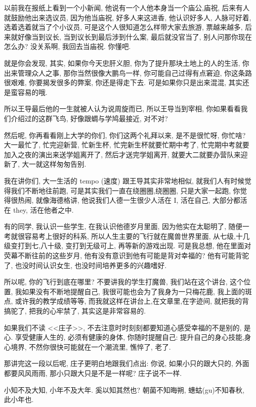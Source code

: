 \documentclass[11pt]{article}
\begin{document}
以前我在报纸上看到一个小新闻, 他说有一个人他本身当一个庙公,庙祝, 后来有人就鼓励他出来选议员, 因为他当庙祝, 好多人来这进香, 他认识好多人, 人脉可好着, 选着选着就当了个小议员, 可是这个人很知道怎么样带大家去旅游, 票越来越多, 后来就好像当到议长, 当到议长到最后涉到什么案, 最后就没官当了, 别人问那你现在怎么办? 没关系啊, 我回去当庙祝. 你懂吧. 

就是你会发现, 其实, 如果你今天忠肝义胆, 你为了提升那块土地上的人的生活, 你出来管理众人之事, 那你当然很像大鹏鸟一样, 你可能自己过得有点窘迫, 你这条路很艰难, 你要揭发很多的弊案, 你还是得走下去. 可是如果你只是出来混混, 其实还是蛮容易的哦.

所以王导最后他的一生就被人认为说周旋而已, 所以王导当到宰相, 你如果看看我们介绍过的这群飞鸟, 好像跟蜩与学鸠最接近, 对不对? 
 
然后呢, 你再看看刚上大学的你们, 你们这两个礼拜以来, 是不是很忙呀, 你忙啥? 大一最忙了, 忙完迎新营, 忙新生杯, 忙完新生杯就要忙期中考了, 忙完期中考就要加入之夜的演出来送学姐离开了, 然后才送完学姐离开, 就要大二就要办营队来迎新了, 大一就这样匆匆告别. 

我在讲你们, 大一生活的 tempo (速度) 跟王导其实非常地相似, 就我们人有时候觉得我们不断地往前跑, 可是其实我们一直在绕圈圈,绕圈圈, 只是大家一起跑, 你觉得很热闹, 就像海德格讲, 他说我们人德一生很少人活在 I, 活在自己, 大部分都活在 they, 活在他者之中.

有的同学, 我认识一些学生, 在我认识他德岁月里面, 因为他实在太聪明了, 随便一考就很容易考上很好的科系, 所以人生主要的飞行就在魔兽世界里面, 从七级,十几级变打到七,八十级, 变打到无级可上, 再等新的游戏出现. 可是我总想, 他在里面对荧幕不断往前的这些岁月, 他有没有意识到他有可能是背对幸福的? 他有可能背驼了, 也没时间认识女生, 也没时间培养更多的兴趣嗜好.

所以呢, 你的飞行到底在哪里? 不要讲我的学生打魔兽, 我们站在这个讲台, 这个位置, 我如果没有不断地提醒自己, 我很可能也会为了我身为一只梅花鹿, 我上面的斑点, 或许我的教学成绩等等, 而我就这样在讲台上,在文章里,在字迹间, 就把我的背搞驼了, 把我的心牢禁了, 其实这是非常容易的. 

如果我们不读 <<庄子>>, 不去注意时时刻刻都要知道心感受幸福的不是别的, 是心. 享受健康人生的, 必须有健康的身体, 你随时提醒自己: 提升自己的身心技能,身心境界, 不然你很快可能就在一个潮流里, 憔悴了, 老了. 

那讲完这一段以后呢, 庄子更明白地跟我们点出: 你说, 如果小只的跟大只的, 外面都要风风雨雨, 那小只跟大只是不是一样呢? 庄子说不一样. 

 
\begin{center}
	{\color{magenta} 小知不及大知, 小年不及大年. 奚以知其然也? 朝菌不知晦朔, 蟪蛄(gu)不知春秋, 此小年也. }
\end{center}
\end{document}
